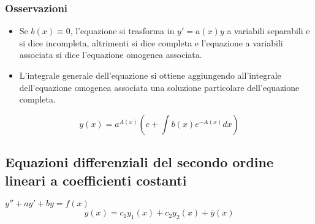 \subsubsection{Osservazioni}
\begin{itemize}
\item Se $b(x)\equiv 0$, l'equazione si trasforma in $y'=a(x)y$ a variabili separabili e si dice incompleta, altrimenti si dice completa e l'equazione a variabili associata si 
dice l'equazione omogenea associata.
\item  L'integrale generale dell'equazione si ottiene aggiungendo all'integrale dell'equazione omogenea associata una soluzione particolare dell'equazione completa.
\end{itemize}
\begin{equation}
y(x)=a^{A(x)}(c+\int b(x)e^{-A(x)}dx)
\end{equation}
\subsection{Equazioni differenziali del secondo ordine lineari a coefficienti costanti}
$y''+ay'+by=f(x)$
\begin{equation}
y(x)=c_1y_1(x)+c_2y_2(x)+\bar{y}(x)
\end{equation}





